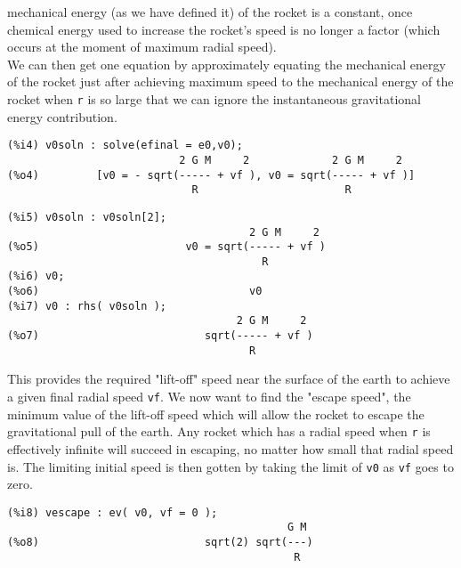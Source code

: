 \documentclass[12pt]{article}
\begin{document}
  mechanical energy (as we have defined it) of the rocket is a constant, once chemical energy
  used to increase the rocket's speed is no longer a factor (which occurs at the moment
  of maximum radial speed).\\
We can then get one equation by approximately equating the mechanical energy of the
  rocket just after achieving maximum speed to the mechanical energy of the rocket when 
  \verb|r| is so large that we can ignore the instantaneous gravitational energy contribution.
\small
\begin{verbatim}									   
(%i4) v0soln : solve(efinal = e0,v0);
                           2 G M     2             2 G M     2
(%o4)         [v0 = - sqrt(----- + vf ), v0 = sqrt(----- + vf )]
                             R                       R
\end{verbatim}
\newpage
\begin{verbatim}
(%i5) v0soln : v0soln[2];
                                      2 G M     2
(%o5)                       v0 = sqrt(----- + vf )
                                        R
(%i6) v0;
(%o6)                                 v0
(%i7) v0 : rhs( v0soln );
                                    2 G M     2
(%o7)                          sqrt(----- + vf )
                                      R
\end{verbatim}
\normalsize
This provides the required "lift-off" speed near the surface of the earth to achieve 
  a given final radial speed \verb|vf|. 
We now want to find the "escape speed", the minimum value of the lift-off speed which
  will allow the rocket to escape the gravitational pull of the earth.
Any rocket which has a radial speed when \verb|r| is effectively infinite will succeed
  in escaping, no matter how small that radial speed is. 
The limiting initial speed is then gotten by taking the limit of \verb|v0| as \verb|vf|
  goes to zero.
\small
\begin{verbatim}								  
(%i8) vescape : ev( v0, vf = 0 );
                                            G M
(%o8)                          sqrt(2) sqrt(---)
                                             R
\end{verbatim}
\normalsize
\end{document}
